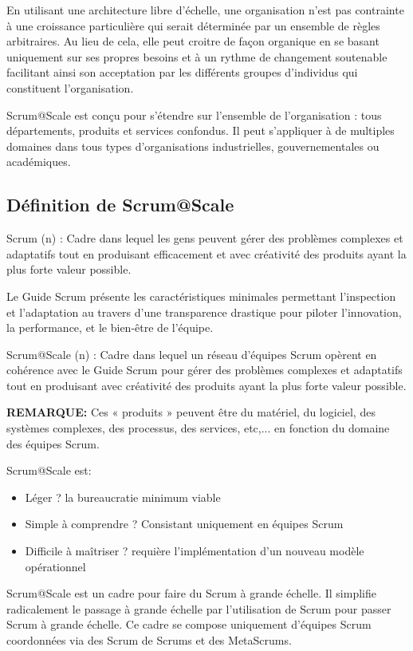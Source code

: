\documentclass[12pt,a4paper,parskip=full]{scrartcl}
\begin{document}
En utilisant une architecture libre d'échelle, une organisation n'est pas contrainte à une
croissance particulière qui serait déterminée par un ensemble de règles arbitraires. Au lieu
de cela, elle peut croitre de façon organique en se basant uniquement sur ses propres
besoins et à un rythme de changement soutenable facilitant ainsi son acceptation par les
différents groupes d'individus qui constituent l'organisation.

Scrum@Scale est conçu pour s'étendre sur l'ensemble de l'organisation : tous
départements, produits et services confondus. Il peut s'appliquer à de multiples domaines
dans tous types d'organisations industrielles, gouvernementales ou académiques.

\subsection{Définition de Scrum@Scale}
Scrum (n) : Cadre dans lequel les gens peuvent gérer des problèmes complexes et
adaptatifs tout en produisant efficacement et avec créativité des produits ayant la plus
forte valeur possible.

Le Guide Scrum présente les caractéristiques minimales permettant l'inspection et
l'adaptation au travers d'une transparence drastique pour piloter l'innovation, la
performance, et le bien-être de l'équipe.

Scrum@Scale (n) : Cadre dans lequel un réseau d'équipes Scrum opèrent en cohérence
avec le Guide Scrum pour gérer des problèmes complexes et adaptatifs tout en produisant
avec créativité des produits ayant la plus forte valeur possible.

\textbf{REMARQUE:} Ces « produits » peuvent être du matériel, du logiciel, des systèmes
complexes, des processus, des services, etc,... en fonction du domaine des équipes
Scrum.

Scrum@Scale est:
\begin{itemize}
\item Léger ? la bureaucratie minimum viable
\item Simple à comprendre ? Consistant uniquement en équipes Scrum
\item Difficile à maîtriser ? requière l'implémentation d'un nouveau modèle opérationnel
\end{itemize}


Scrum@Scale est un cadre pour faire du Scrum à grande échelle. Il simplifie radicalement
le passage à grande échelle par l'utilisation de Scrum pour passer Scrum à grande
échelle. Ce cadre se compose uniquement d'équipes Scrum coordonnées via des Scrum
de Scrums et des MetaScrums.
\end{document}
